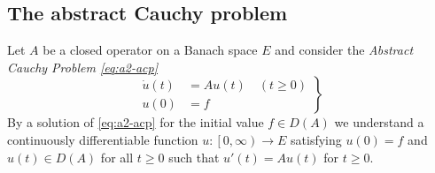 \subsection{The abstract Cauchy problem} \label{subsec:a2-1.se1}
Let $A$ be a closed operator on a Banach space $E$ and consider the \emph{Abstract Cauchy Problem \eqref{eq:a2-acp}}
\begin{equation*}\label{eq:a2-acp} \tag{ACP}
\left.
\begin{split}
    \dot{u}(t) &= Au(t) \quad (t \geq 0) \\
    u(0) &= f
\end{split} 
\right\}   
\end{equation*}
By a solution of \eqref{eq:a2-acp} for the initial value $f \in D(A)$ we understand a continuously differentiable function $u \colon \left[0,\infty\right) \to E$ satisfying $u(0) = f$ and $u(t) \in D(A)$ for all $t \geq 0$ such that $u'(t) = Au(t)$ for $t \geq 0$.


